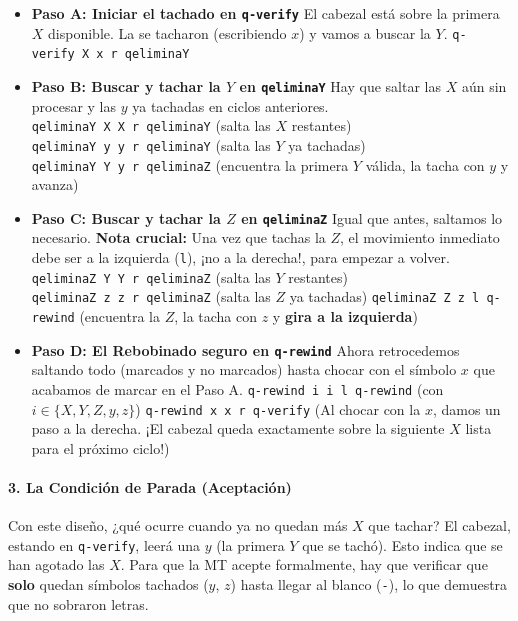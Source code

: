 \documentclass[12pt]{book} %
\begin{document}
\begin{itemize}
\item
  \textbf{Paso A: Iniciar el tachado en \texttt{q-verify}} El cabezal
  está sobre la primera \(X\) disponible. La se tacharon (escribiendo
  \(x\)) y vamos a buscar la \(Y\).
  \texttt{q-verify\ X\ x\ r\ qeliminaY}
\item
  \textbf{Paso B: Buscar y tachar la \(Y\) en \texttt{qeliminaY}} Hay
  que saltar las \(X\) aún sin procesar y las \(y\) ya tachadas en
  ciclos anteriores. \texttt{qeliminaY\ X\ X\ r\ qeliminaY} (salta las
  \(X\) restantes) \texttt{qeliminaY\ y\ y\ r\ qeliminaY} (salta las
  \(Y\) ya tachadas) \texttt{qeliminaY\ Y\ y\ r\ qeliminaZ} (encuentra
  la primera \(Y\) válida, la tacha con \(y\) y avanza)
\item
  \textbf{Paso C: Buscar y tachar la \(Z\) en \texttt{qeliminaZ}} Igual
  que antes, saltamos lo necesario. \textbf{Nota crucial:} Una vez que
  tachas la \(Z\), el movimiento inmediato debe ser a la izquierda
  (\texttt{l}), ¡no a la derecha!, para empezar a volver.
  \texttt{qeliminaZ\ Y\ Y\ r\ qeliminaZ} (salta las \(Y\) restantes)
  \texttt{qeliminaZ\ z\ z\ r\ qeliminaZ} (salta las \(Z\) ya tachadas)
  \texttt{qeliminaZ\ Z\ z\ l\ q-rewind} (encuentra la \(Z\), la tacha
  con \(z\) y \textbf{gira a la izquierda})
\item
  \textbf{Paso D: El Rebobinado seguro en \texttt{q-rewind}} Ahora
  retrocedemos saltando todo (marcados y no marcados) hasta chocar con
  el símbolo \(x\) que acabamos de marcar en el Paso A.
  \texttt{q-rewind\ i\ i\ l\ q-rewind} (con \(i \in \{X, Y, Z, y, z\}\))
  \texttt{q-rewind\ x\ x\ r\ q-verify} (Al chocar con la \(x\), damos un
  paso a la derecha. ¡El cabezal queda exactamente sobre la siguiente
  \(X\) lista para el próximo ciclo!)
\end{itemize}

\hypertarget{la-condiciuxf3n-de-parada-aceptaciuxf3n}{%
\paragraph{3. La Condición de Parada
(Aceptación)}\label{la-condiciuxf3n-de-parada-aceptaciuxf3n}}

Con este diseño, ¿qué ocurre cuando ya no quedan más \(X\) que tachar?
El cabezal, estando en \texttt{q-verify}, leerá una \(y\) (la primera
\(Y\) que se tachó). Esto indica que se han agotado las \(X\). Para que
la MT acepte formalmente, hay que verificar que \textbf{solo} quedan
símbolos tachados (\(y\), \(z\)) hasta llegar al blanco (\texttt{-}), lo
que demuestra que no sobraron letras.
\end{document}
